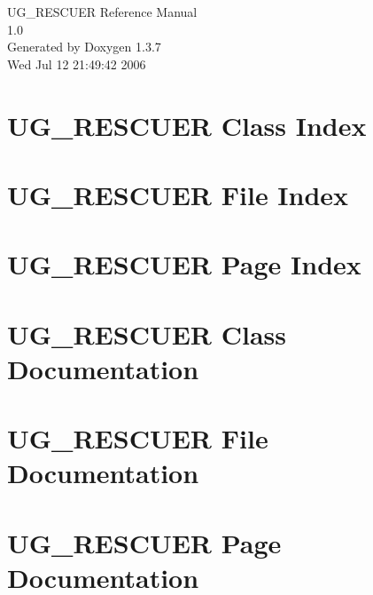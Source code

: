 \documentclass[a4paper]{book}
\begin{document}
\begin{titlepage}
\vspace*{7cm}
\begin{center}
{\Large UG\_\-RESCUER Reference Manual\\[1ex]\large 1.0 }\\
\vspace*{1cm}
{\large Generated by Doxygen 1.3.7}\\
\vspace*{0.5cm}
{\small Wed Jul 12 21:49:42 2006}\\
\end{center}
\end{titlepage}
\clearemptydoublepage
{}
\tableofcontents
\clearemptydoublepage
{}
\chapter{UG\_\-RESCUER Class Index}

\chapter{UG\_\-RESCUER File Index}

\chapter{UG\_\-RESCUER Page Index}

\chapter{UG\_\-RESCUER Class Documentation}


\chapter{UG\_\-RESCUER File Documentation}






\chapter{UG\_\-RESCUER Page Documentation}

\printindex
\end{document}

